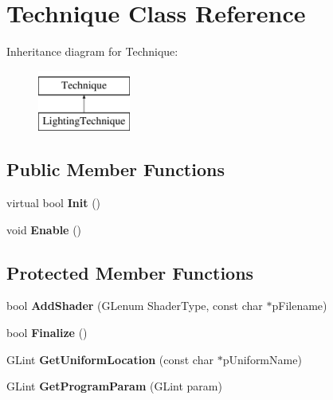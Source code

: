 \hypertarget{classTechnique}{\section{Technique Class Reference}
\label{classTechnique}
}
Inheritance diagram for Technique\-:\begin{figure}[H]
\begin{center}
\leavevmode
\includegraphics[height=2.000000cm]{classTechnique}
\end{center}
\end{figure}
\subsection*{Public Member Functions}
\begin{DoxyCompactItemize}
\item 
\hypertarget{classTechnique_a3069d5cf658e38c33bfe58da0a5f8da9}{virtual bool {\bfseries Init} ()}\label{classTechnique_a3069d5cf658e38c33bfe58da0a5f8da9}

\item 
\hypertarget{classTechnique_a81be1d1aa3e0796cbd9bbca8f4e134e2}{void {\bfseries Enable} ()}\label{classTechnique_a81be1d1aa3e0796cbd9bbca8f4e134e2}

\end{DoxyCompactItemize}
\subsection*{Protected Member Functions}
\begin{DoxyCompactItemize}
\item 
\hypertarget{classTechnique_acf9cabc2c61a760c5a82b8414b04a5fc}{bool {\bfseries Add\-Shader} (G\-Lenum Shader\-Type, const char $\ast$p\-Filename)}\label{classTechnique_acf9cabc2c61a760c5a82b8414b04a5fc}

\item 
\hypertarget{classTechnique_a19512f7930347cb9132168da0c929a9d}{bool {\bfseries Finalize} ()}\label{classTechnique_a19512f7930347cb9132168da0c929a9d}

\item 
\hypertarget{classTechnique_a618a81179129728e48865511345e8b59}{G\-Lint {\bfseries Get\-Uniform\-Location} (const char $\ast$p\-Uniform\-Name)}\label{classTechnique_a618a81179129728e48865511345e8b59}

\item 
\hypertarget{classTechnique_afb06b0b9660c054f1d6ccdb0312d5ab4}{G\-Lint {\bfseries Get\-Program\-Param} (G\-Lint param)}\label{classTechnique_afb06b0b9660c054f1d6ccdb0312d5ab4}

\end{DoxyCompactItemize}
